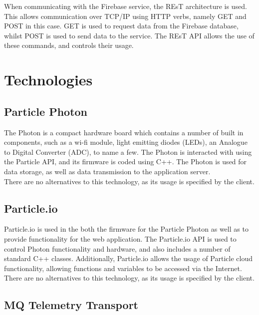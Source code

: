 \documentclass{article}
\begin{document}
	When communicating with the Firebase service, the REsT architecture 
	is used. This allows communication over TCP/IP using HTTP verbs, 
	namely GET and POST in this case. GET is used to request data from 
	the Firebase database, whilst POST is used to send data to the 
	service. The REsT API allows the use of these commands, and controls 
	their usage.

\newpage

\section{Technologies}
	
	\subsection{Particle Photon}
	
	The Photon is a compact hardware board which contains a number of 
	built in components, such as a wi-fi module, light emitting diodes 
	(LEDs), an Analogue to Digital Converter (ADC), to name a few. The 
	Photon is interacted with using the Particle API, and its firmware is 
	coded using C++. The Photon is used for data storage, as well as data 
	transmission to the application server.\\
	
	\noindent
	There are no alternatives to this technology, as its usage is 
	specified by the client.
	
	\subsection{Particle.io}
	
	Particle.io is used in the both the firmware for the Particle Photon as well as to provide functionality for the web application. The Particle.io API is used to control Photon 
	functionality and hardware, and also includes a number of standard C++ classes. Additionally, Particle.io allows the usage of Particle cloud functionality, allowing functions and variables 
	to be accessed via the Internet.\\
	
	\noindent
	There are no alternatives to this technology, as its usage is specified by the client.
	
	
	\subsection{MQ Telemetry Transport}
	
\end{document}
